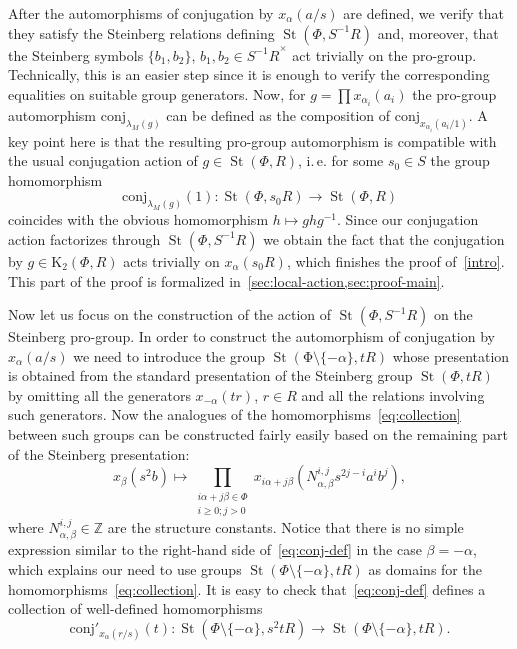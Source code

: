 \documentclass[oneside, 11pt]{amsart}
\numberwithin{equation}{section}
\theoremstyle{definition}
\theoremstyle{remark}
\DeclareMathOperator\St{St}
\begin{document}
After the automorphisms of conjugation by $x_\alpha(a/s)$ are defined, we verify that they satisfy the Steinberg relations defining $\St(\Phi, S^{-1}R)$ and, moreover, that the Steinberg symbols $\{b_1, b_2\}$, $b_1, b_2 \in {S^{-1}R}^\times$ act trivially on the pro-group. Technically, this is an easier step since it is enough to verify the corresponding equalities on suitable group generators.
Now, for $g = \prod x_{\alpha_i}(a_i)$ the pro-group automorphism $\mathrm{conj}_{\lambda_M(g)}$ can be defined as the composition of $\mathrm{conj}_{x_{\alpha_i}(a_i/1)}$.
A key point here is that the resulting pro-group automorphism is compatible with the usual conjugation action of $g \in \St(\Phi, R)$, i.\,e. for some $s_0 \in S$ the group homomorphism \[\mathrm{conj}_{\lambda_M(g)}(1) \colon \St(\Phi, s_0R) \to \St(\Phi, R)\] coincides with the obvious homomorphism $h \mapsto ghg^{-1}$. Since our conjugation action factorizes through $\St(\Phi, S^{-1}R)$ we obtain the fact that the conjugation by $g \in \mathrm K_2(\Phi, R)$ acts trivially on $x_\alpha(s_0R)$, which finishes the proof of~\eqref{intro}. This part of the proof is formalized in~\cref{sec:local-action,sec:proof-main}.

Now let us focus on the construction of the action of $\St(\Phi, S^{-1}R)$ on the Steinberg pro-group. In order to construct the automorphism of conjugation by $x_{\alpha}(a/s)$ we need to introduce the group $\St(\mathrm \Phi\setminus\{-\alpha\}, tR)$ whose presentation is obtained from the standard presentation of the Steinberg group $\St(\Phi, tR)$ by omitting all the generators $x_{-\alpha}(tr)$, $r \in R$ and all the relations involving such generators. Now the analogues of the homomorphisms~\eqref{eq:collection} between such groups can be constructed fairly easily based on the remaining part of the Steinberg presentation:
\begin{equation} \label{eq:conj-def} x_\beta(s^2 b) \mapsto \prod_{\substack{i \alpha + j \beta \in \Phi\\ i \geq 0; j > 0}} x_{i\alpha + j\beta}(N_{\alpha, \beta}^{i, j} s^{2j - i} a^i b^j), \end{equation}
where \(N_{\alpha, \beta}^{i, j} \in \mathbb Z\) are the structure constants.
Notice that there is no simple expression similar to the right-hand side of~\eqref{eq:conj-def} in the case $\beta=-\alpha$, which explains our need to use groups $\St(\Phi\setminus\{-\alpha\}, tR)$ as domains for the homomorphisms~\eqref{eq:collection}.
It is easy to check that~\eqref{eq:conj-def} defines a collection of well-defined homomorphisms
\[\mathrm{conj}'_{x_\alpha(r/s)}(t)\colon \St(\Phi\setminus\{-\alpha\}, s^2 tR) \to \St(\Phi\setminus\{-\alpha\}, tR).\]
\end{document}
